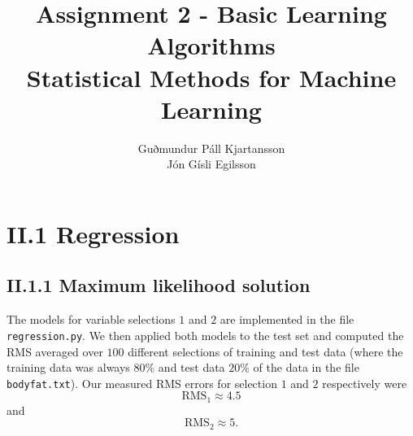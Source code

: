 \documentclass[a4paper,10pt]{article}
\title{
	Assignment 2 - Basic Learning Algorithms	\\
	Statistical Methods for Machine Learning
  }
\author{
	Guðmundur Páll Kjartansson \\
	Jón Gísli Egilsson
}
\begin{document}
\maketitle

\section*{II.1 Regression}

\subsection*{II.1.1 Maximum likelihood solution}

The models for variable selections $1$ and $2$ are implemented in the file \verb=regression.py=. We then applied both models to the test set and computed the RMS averaged over $100$ different selections of training and test data (where the training data was always $80\%$ and test data $20\%$ of the data in the file \verb=bodyfat.txt=). Our measured RMS errors for selection $1$ and $2$ respectively were
$$\text{RMS}_1 \approx 4.5$$
and
$$\text{RMS}_2 \approx 5.$$


\begin{comment}
\begin{figure}[H]
	\centering
	\begin{subfigure}{0.45\textwidth}
  		\centering
  		\texttt{[image: ../week4/images/prob41asurf.png]}
  		\caption{$x=(0,-1)$}
  \end{subfigure}
  \begin{subfigure}{0.45\textwidth}
  		\centering
  		\texttt{[image: ../week4/images/prob41bsurf.png]}
  		\caption{$x=(0,0.05)$}
  \end{subfigure}
  	\caption{Surface plots of $m(p)$ at different points}
\end{figure}
\end{comment}
\end{document}
